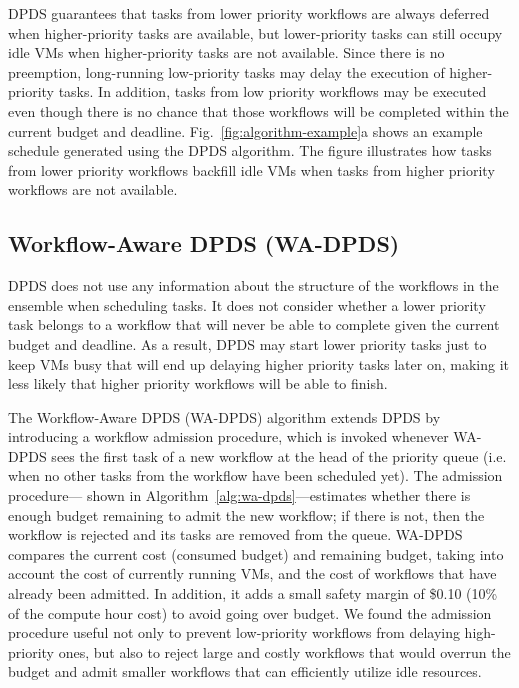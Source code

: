 \documentclass[conference]{IEEEtran}
\begin{document}
DPDS guarantees that tasks from lower priority workflows are always deferred
when higher-priority tasks are available, but lower-priority tasks can still
occupy idle VMs when higher-priority tasks are not available. Since there is
no preemption, long-running low-priority tasks may delay the execution of
higher-priority tasks. In addition, tasks from low priority workflows may be
executed even though there is no chance that those workflows will be completed
within the current budget and deadline. Fig.~\ref{fig:algorithm-example}a
shows an example schedule generated using the DPDS algorithm. The figure
illustrates how tasks from lower priority workflows backfill idle VMs when
tasks from higher priority workflows are not available.


\subsection{Workflow-Aware DPDS (WA-DPDS)}

DPDS does not use any information about the structure of the
workflows in the ensemble when scheduling tasks.  It does not
consider whether a lower priority task belongs to a workflow that will never be
able to complete given the current budget and deadline. As a result, DPDS may
start lower priority tasks just to keep VMs busy that will end up delaying
higher priority tasks later on, making it less likely that higher priority
workflows will be able to finish.

The Workflow-Aware DPDS (WA-DPDS) algorithm extends DPDS by introducing a
workflow admission procedure, which is invoked whenever WA-DPDS sees the first
task of a new workflow at the head of the priority queue (i.e. when no other
tasks from the workflow have been scheduled yet). The admission procedure---
shown in Algorithm~\ref{alg:wa-dpds}---estimates whether there is enough
budget remaining to admit the new workflow; if there is not, then the workflow
is rejected and its tasks are removed from the queue. WA-DPDS compares the
current cost (consumed budget) and remaining budget, taking into account the
cost of currently running VMs, and the cost of workflows that have already
been admitted. In addition, it adds a small safety margin of \$0.10 (10\% of the
compute hour cost) to avoid going over budget. We found the admission procedure useful not only to prevent
low-priority workflows from delaying high-priority ones, but also to reject
large and costly workflows that would overrun the budget and admit smaller
workflows that can efficiently utilize idle resources. 
\end{document}

